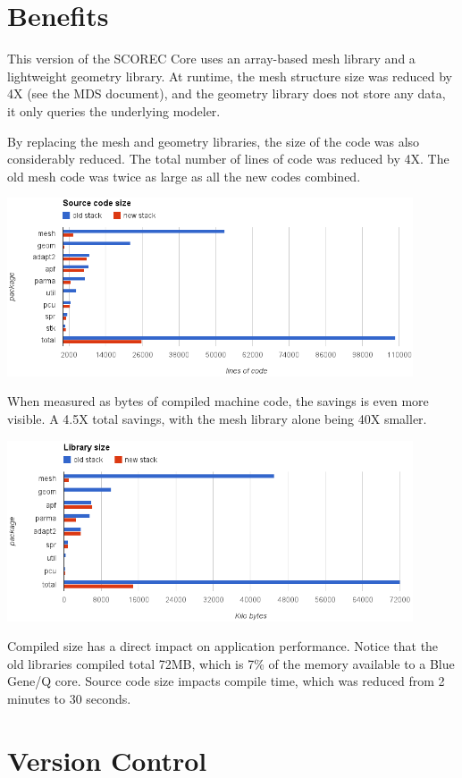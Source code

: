 \documentclass{article}
\begin{document}
\section{Benefits}

This version of the SCOREC Core uses an array-based mesh
library and a lightweight geometry library.
At runtime, the mesh structure size was reduced by 4X
(see the MDS document), and the geometry library does
not store any data, it only queries the underlying modeler.

By replacing the mesh and geometry libraries,
the size of the code was also considerably reduced.
The total number of lines of code was reduced by 4X.
The old mesh code was twice as large as all the new
codes combined.

\includegraphics[width=0.9\textwidth]{loc.png}

When measured as bytes of compiled machine code, the savings
is even more visible.
A 4.5X total savings, with the mesh library alone being 40X
smaller.

\includegraphics[width=0.9\textwidth]{libsize.png}

Compiled size has a direct impact on application performance.
Notice that the old libraries compiled total 72MB, which
is 7\% of the memory available to a Blue Gene/Q core.
Source code size impacts compile time, which was reduced from
2 minutes to 30 seconds.

\section{Version Control}
\end{document}
